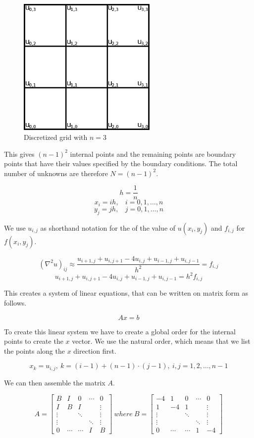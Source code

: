 \begin{figure}[ht]
	\center
	\includegraphics[width=0.6\textwidth]{images/2d_poisson_ex}
	\caption{Discretized grid with $n = 3$}
	\label{fig:discgrid}
\end{figure}

This gives $(n-1)^2$ internal points and the remaining points are boundary
points that have their values specified by the boundary conditions. The total
number of unknowns are therefore $N = (n-1)^2$.

$$h = \frac{1}{n}$$
$$x_i = ih, ~~~~ i = 0, 1, \dots, n$$
$$y_j = jh, ~~~~ j = 0, 1, \dots, n$$

We use $u_{i,j}$ as shorthand notation for the of the value of $u(x_i, y_j)$ and
$f_{i,j}$ for $f(x_i, y_j)$.

$$ (\nabla^2 u)_{ij} \approx \frac{u_{i+1,j} + u_{i,j+1} - 4u_{i,j} + u_{i-1,j} + u_{i,j-1}}{h^2} = f_{i,j} $$
$$ u_{i+1,j} + u_{i,j+1} - 4u_{i,j} + u_{i-1,j} + u_{i,j-1} = h^2 f_{i,j} $$

This creates a system of linear equations, that can be written on matrix form as
follows.

$$Ax = b$$

To create this linear system we have to create a global order for the
internal points to create the $x$ vector. We use the natural order, which means
that we list the points along the $x$ direction first.

$$x_k = u_{i,j}, ~ k = (i-1) + (n-1) \cdot (j-1), ~ i, j = 1, 2, \dots, n-1$$

We can then assemble the matrix $A$.

$$
A = \begin{bmatrix}
 B & I & 0 & \cdots & 0 \\
 I & B & I &   & \vdots \\
 \vdots &   & \ddots &   & \vdots \\
 \vdots &   &   & \ddots & \vdots \\
 0 & \cdots & \cdots & I & B 
\end{bmatrix}
 ~ where ~ 
B = \begin{bmatrix}
-4 & 1 & 0 & \cdots & 0 \\
 1 &-4 & 1 &   & \vdots \\
 \vdots &   & \ddots &   & \vdots \\
 \vdots &   &   & \ddots & \vdots \\
 0 & \cdots & \cdots & 1 &-4 
\end{bmatrix}
$$

